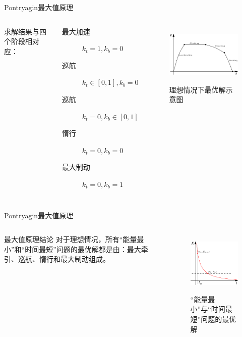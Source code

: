 \documentclass{beamer}
\begin{document}
\begin{frame}{Pontryagin最大值原理}
\begin{columns}[c]
\column{5cm}
求解结果与四个阶段相对应：
\begin{description}
  \item[最大加速] $k_t = 1, k_b = 0$
  \item[巡航] $k_t \in [0,1], k_b = 0$
  \item[巡航] $k_t = 0, k_b \in [0,1]$
  \item[惰行] $k_t = 0, k_b = 0$
  \item[最大制动] $k_t = 0, k_b = 1$
\end{description}

\column{7cm}
\begin{figure}
  \centering
  \includegraphics[width=7cm]{fig/fig4/fig4.pdf}\\
  \caption{理想情况下最优解示意图}
\end{figure}

\end{columns}
\end{frame}

\begin{frame}{Pontryagin最大值原理}
\begin{columns}[c]
\column{8cm}

\begin{block}{最大值原理结论}
对于理想情况，所有“能量最小”和“时间最短”问题的最优解都是由：最大牵引、巡航、惰行和最大制动组成。
\end{block}

\column{4.2cm}
\begin{figure}
  \centering
  \includegraphics[width=4cm]{fig/fig2/fig2.pdf}\\
  \caption{“能量最小”与“时间最短”问题的最优解}
\end{figure}


\end{columns}
\end{frame}
\end{document}
